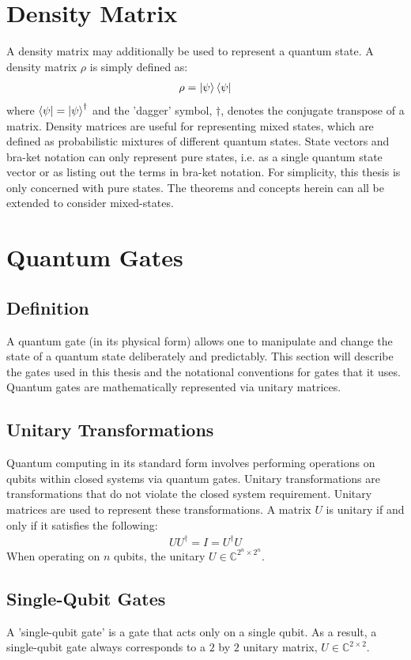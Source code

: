 \section{Density Matrix}
A density matrix may additionally be used to represent a quantum state. A density matrix $\rho$ is simply defined as:
\begin{align}
\rho = \ket{\psi} \bra{\psi}
\end{align}
where $\bra{\psi} = \ket{\psi}^{\dagger}$ and the 'dagger' symbol, $\dagger$, denotes the conjugate transpose of a matrix. Density matrices are useful for representing mixed states, which are defined as probabilistic mixtures of different quantum states. State vectors and bra-ket notation can only represent pure states, i.e. as a single quantum state vector or as listing out the terms in bra-ket notation. For simplicity, this thesis is only concerned with pure states. The theorems and concepts herein can all be extended to consider mixed-states.

\section{Quantum Gates}
\subsection{Definition}
A quantum gate (in its physical form) allows one to manipulate and change the state of a quantum state deliberately and predictably. This section will describe the gates used in this thesis and the notational conventions for gates that it uses. Quantum gates are mathematically represented via unitary matrices.
\subsection{Unitary Transformations}
Quantum computing in its standard form involves performing operations on qubits within closed systems via quantum gates. Unitary transformations are transformations that do not violate the closed system requirement. Unitary matrices are used to represent these transformations. A matrix $U$ is unitary if and only if it satisfies the following:
\begin{align}
UU^{\dagger} = I = U^{\dagger}U
\end{align}
When operating on $n$ qubits, the unitary $U \in \mathbb{C}^{2^n \times 2^n}$.
\subsection{Single-Qubit Gates}
\label{sec:signleQubitlGate}
A 'single-qubit gate' is a gate that acts only on a single qubit. As a result, a single-qubit gate always corresponds to a $2$ by $2$ unitary matrix, $U \in \mathbb{C}^{2 \times 2}$.

